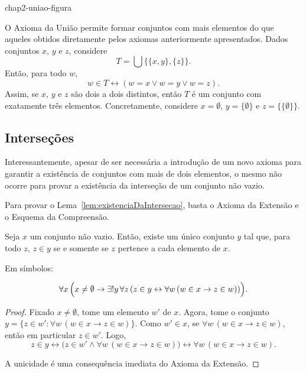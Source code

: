 {chap2-uniao-figura}

\begin{example}[$\BST$]\label{ex:conjuntoComTresElementos}
    O Axioma da União permite formar conjuntos com mais elementos do que aqueles obtidos diretamente pelos axiomas anteriormente apresentados.
    Dados conjuntos $x$, $y$ e $z$, considere
    \[
        T=\bigcup\{\{x,y\},\{z\}\}.
    \]
    Então, para todo $w$,
    \[
        w\in T \leftrightarrow (w=x \lor w=y \lor w=z).
    \]
    Assim, se $x$, $y$ e $z$ são dois a dois distintos, então $T$ é um conjunto com exatamente três elementos.
    Concretamente, considere $x=\emptyset$, $y=\{\emptyset\}$ e $z=\{\{\emptyset\}\}$.
\end{example}

\subsection{Interseções}\label{subsec:intersecoes}
Interessantemente, apesar de ser necessária a introdução de um novo axioma para garantir a existência de conjuntos com mais de dois elementos, o mesmo não ocorre para provar a existência da interseção de um conjunto não vazio.

Para provar o Lema~\ref{lem:existenciaDaIntersecao}, basta o Axioma da Extensão e o Esquema da Compreensão.
\begin{lemma}[$\BST$]\label{lem:existenciaDaIntersecao}
    Seja $x$ um conjunto não vazio.
    Então, existe um único conjunto $y$ tal que, para todo $z$, $z \in y$ se e somente se $z$ pertence a cada elemento de $x$.

    Em símbolos:

    \[
        \forall x\, \Bigl(x \neq \emptyset \rightarrow \exists! y\, \forall z\, (z \in y \leftrightarrow \forall w\, (w \in x \rightarrow z \in w))\Bigr).
    \]
\end{lemma}
\begin{proof}
    Fixado $x\neq \emptyset$, tome um elemento $w'$ de $x$.
    Agora, tome o conjunto $y = \{ z \in w' : \forall w\, (w \in x \rightarrow z \in w) \}$.
    Como $w' \in x$, se $\forall w\, (w \in x \rightarrow z \in w)$, então em particular $z \in w'$.
    Logo,
    \[
    z \in y \leftrightarrow \bigl(z \in w' \land \forall w\, (w \in x \rightarrow z \in w)\bigr)
    \leftrightarrow \forall w\, (w \in x \rightarrow z \in w).
    \]

    A unicidade é uma consequência imediata do Axioma da Extensão.
\end{proof}

